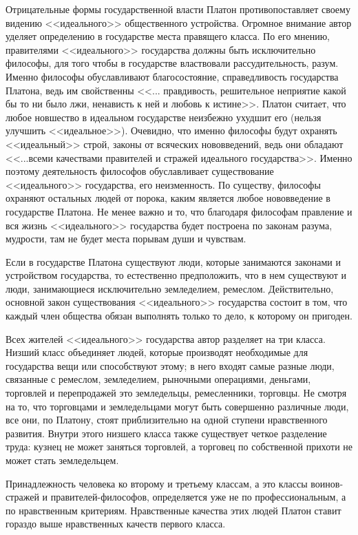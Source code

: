 	Отрицательные формы государственной власти Платон противопоставляет своему 
	видению <<идеального>> общественного устройства. Огромное внимание автор 
	уделяет определению в государстве места правящего класса. По его мнению, 
	правителями <<идеального>> государства должны быть исключительно философы, 
	для того чтобы в государстве властвовали рассудительность, разум. Именно 
	философы обуславливают благосостояние, справедливость государства Платона, 
	ведь им свойственны <<... правдивость, решительное неприятие какой бы то ни 
	было лжи, ненависть к ней и любовь к истине>>. Платон считает, что любое 
	новшество в идеальном государстве неизбежно ухудшит его (нельзя улучшить 
	<<идеальное>>). Очевидно, что именно философы будут охранять <<идеальный>> 
	строй, законы от всяческих нововведений, ведь они обладают <<...всеми 
	качествами правителей и стражей идеального государства>>. Именно поэтому 
	деятельность философов обуславливает существование <<идеального>> 
	государства, его неизменность. По существу, философы охраняют остальных 
	людей от порока, каким является любое нововведение в государстве Платона. 
	Не менее важно и то, что благодаря философам правление и вся жизнь 
	<<идеального>> государства будет построена по законам разума, мудрости, там 
	не будет места порывам души и чувствам. 

	Если в государстве Платона существуют люди, которые занимаются законами и 
	устройством государства, то естественно предположить, что в нем существуют 
	и люди, занимающиеся исключительно земледелием, ремеслом. Действительно, 
	основной закон существования <<идеального>> государства состоит в том, что 
	каждый член общества обязан выполнять только то дело, к которому он 
	пригоден.

	Всех жителей <<идеального>> государства автор разделяет на три класса. 
	Низший класс объединяет людей, которые производят необходимые для 
	государства вещи или способствуют этому; в него входят самые разные люди, 
	связанные с ремеслом, земледелием, рыночными операциями, деньгами, 
	торговлей и перепродажей это земледельцы, ремесленники, торговцы. Не 
	смотря на то, что торговцами и земледельцами могут быть совершенно 
	различные люди, все они, по Платону, стоят приблизительно на одной ступени 
	нравственного развития. Внутри этого низшего класса также существует 
	четкое разделение труда: кузнец не может заняться торговлей, а торговец 
	по собственной прихоти не может стать земледельцем. 

	Принадлежность человека ко второму и третьему классам, а это классы 
	воинов-стражей и правителей-философов, определяется уже не по 
	профессиональным, а по нравственным критериям. Нравственные качества этих 
	людей Платон ставит гораздо выше нравственных качеств первого класса.

